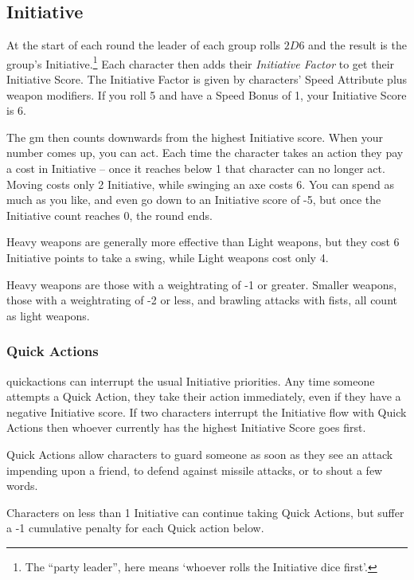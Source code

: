 \begin{multicols}{2}

\subsection{Initiative}
\label{initiative}

At the start of each \gls{round} the leader of each group rolls $2D6$ and the result is the group's Initiative.\footnote{The ``party leader'', here means `whoever rolls the Initiative dice first'.}
Each character then adds their \textit{Initiative Factor} to get their Initiative Score.
The Initiative Factor is given by characters' Speed Attribute plus weapon modifiers.
If you roll 5 and have a Speed Bonus of 1, your Initiative Score is 6.

The \gls{gm} then counts downwards from the highest Initiative score.
When your number comes up, you can act.
Each time the character takes an action they pay a cost in Initiative -- once it reaches below 1 that character can no longer act.
Moving costs only 2 Initiative, while swinging an axe costs 6.
You can spend as much as you like, and even go down to an Initiative score of -5, but once the Initiative count reaches 0, the round ends.

Heavy weapons are generally more effective than Light weapons, but they cost 6 Initiative points to take a swing, while Light weapons cost only 4.

Heavy weapons are those with a \gls{weightrating} of -1 or greater.
Smaller weapons, those with a \gls{weightrating} of -2 or less, and brawling attacks with fists, all count as light weapons.

\subsubsection{Quick Actions}

\Glspl{quickaction} can interrupt the usual Initiative priorities.
Any time someone attempts a Quick Action, they take their action immediately, even if they have a negative Initiative score.
If two characters interrupt the Initiative flow with Quick Actions then whoever currently has the highest Initiative Score goes first.

Quick Actions allow characters to guard someone as soon as they see an attack impending upon a friend, to defend against missile attacks, or to shout a few words.

Characters on less than 1 Initiative can continue taking Quick Actions, but suffer a -1 cumulative penalty for each Quick action below.


\end{multicols}
